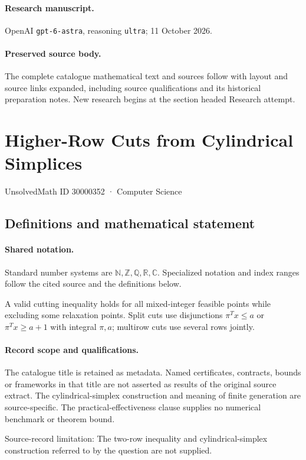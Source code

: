 \documentclass[11pt]{article}
\begin{document}
\paragraph{Research manuscript.} OpenAI \texttt{gpt-6-astra}, reasoning \texttt{ultra}; 11 October 2026.
\paragraph{Preserved source body.} The complete catalogue mathematical text and sources follow with layout and source links expanded, including source qualifications and its historical preparation notes. New research begins at the section headed Research attempt.

\section{Higher-Row Cuts from Cylindrical Simplices}\label{30000352}
{\small UnsolvedMath ID 30000352 · Computer Science}
\subsection{Definitions and mathematical statement}

\paragraph{Shared notation.}Standard number systems are $\mathbb N,\mathbb Z,\mathbb Q,\mathbb R,\mathbb C$. Specialized notation and index ranges follow the cited source and the definitions below.


A valid cutting inequality holds for all mixed-integer feasible points while excluding some relaxation points. Split cuts use disjunctions $\pi^Tx\leq a$ or $\pi^Tx\geq a+1$ with integral $\pi,a$; multirow cuts use several rows jointly.
\paragraph{Record scope and qualifications.}
The catalogue title is retained as metadata. Named certificates, contracts, bounds or frameworks in that title are not asserted as results of the original source extract.
The cylindrical-simplex construction and meaning of finite generation are source-specific. The practical-effectiveness clause supplies no numerical benchmark or theorem bound.

Source-record limitation: The two-row inequality and cylindrical-simplex construction referred to by the question are not supplied.
\end{document}
